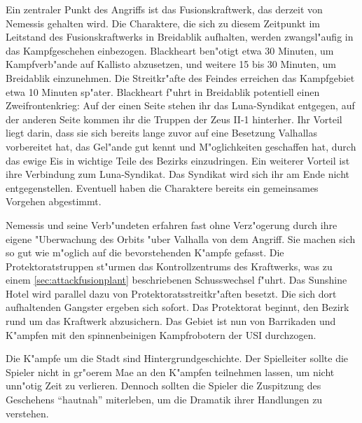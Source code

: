 Ein zentraler Punkt des Angriffs ist das Fusionskraftwerk, das derzeit von Nemessis gehalten wird. Die Charaktere, die sich zu diesem Zeitpunkt im Leitstand des Fusionskraftwerks in Breidablik aufhalten, werden zwangsl"aufig in das Kampfgeschehen einbezogen. Blackheart ben"otigt etwa 30 Minuten, um Kampfverb"ande auf Kallisto abzusetzen, und weitere 15 bis 30 Minuten, um Breidablik einzunehmen. Die Streitkr"afte des Feindes erreichen das Kampfgebiet etwa 10 Minuten sp"ater. Blackheart f"uhrt in Breidablik potentiell einen Zweifrontenkrieg: Auf der einen Seite stehen ihr das Luna-Syndikat entgegen, auf der anderen Seite kommen ihr die Truppen der Zeus II-1 hinterher. Ihr Vorteil liegt darin, dass sie sich bereits lange zuvor auf eine Besetzung Valhallas vorbereitet hat, das Gel"ande gut kennt und M"oglichkeiten geschaffen hat, durch das ewige Eis in wichtige Teile des Bezirks einzudringen. Ein weiterer Vorteil ist ihre Verbindung zum Luna-Syndikat. Das Syndikat wird sich ihr am Ende nicht entgegenstellen. Eventuell haben die Charaktere bereits ein gemeinsames Vorgehen abgestimmt.

Nemessis und seine Verb"undeten erfahren fast ohne Verz"ogerung durch ihre eigene "Uberwachung des Orbits "uber Valhalla von dem Angriff. Sie machen sich so gut wie m"oglich auf die bevorstehenden K"ampfe gefasst. Die Protektoratstruppen st"urmen das Kontrollzentrums des Kraftwerks, was zu einem \cref{sec:attackfusionplant} beschriebenen Schusswechsel f"uhrt. Das Sunshine Hotel wird parallel dazu von Protektoratsstreitkr"aften besetzt. Die sich dort aufhaltenden Gangster ergeben sich sofort. Das Protektorat beginnt, den Bezirk rund um das Kraftwerk abzusichern. Das Gebiet ist nun von Barrikaden und K"ampfen mit den spinnenbeinigen Kampfrobotern der USI durchzogen.

\begin{remarks}
	Die K"ampfe um die Stadt sind Hintergrundgeschichte. Der Spielleiter sollte die Spieler nicht in gr"o\3erem Ma\3e an den K"ampfen teilnehmen lassen, um nicht unn"otig Zeit zu verlieren. Dennoch sollten die Spieler die Zuspitzung des Geschehens ``hautnah'' miterleben, um die Dramatik ihrer Handlungen zu verstehen.
 \end{remarks}
